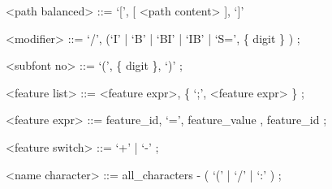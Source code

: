       <path balanced>    ::= `[', [ <path content> ], `]'

      <modifier>         ::= `/', (`I' | `B' | `BI' | `IB' | `S=', \{ {\sc digit} \} ) ;

      <subfont no>       ::= `(', \{ {\sc digit} \}, `)' ;

      <feature list>     ::= <feature expr>, \{ `;', <feature expr> \} ;

      <feature expr>     ::= {\sc feature_id}, `=', {\sc feature_value}
      , {\sc feature_id} ;

      <feature switch>   ::= `+' | `-' ;

      <name character>   ::= {\sc all_characters} - ( `(' | `/' | `:' ) ;
\endsyntaxfloat


